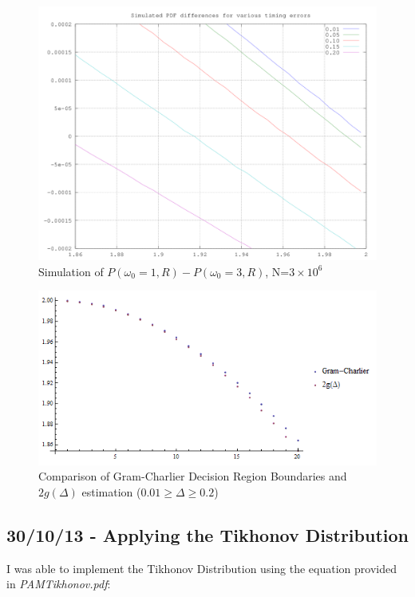 \begin{figure}[htbp]
\centering
\includegraphics{../plots/simdrb.png}
\caption{Simulation of $P(\omega_0=1,R)-P(\omega_0=3,R)$,
N=$3 \times 10^6$}
\end{figure}

\begin{figure}[htbp]
\centering
\includegraphics{../plots/gc_vs_2g.png}
\caption{Comparison of Gram-Charlier Decision Region Boundaries and
$2 g(\Delta)$ estimation ($0.01 \ge \Delta \ge 0.2$)}
\end{figure}

\subsection{30/10/13 - Applying the Tikhonov Distribution}

I was able to implement the Tikhonov Distribution using the equation
provided in \emph{PAMTikhonov.pdf}:

